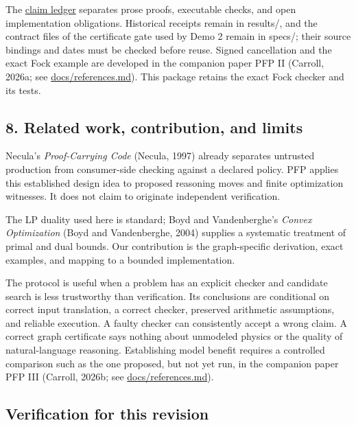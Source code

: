 \documentclass[
  11pt,
]{article}
\begin{document}
The \href{claim_ledger.md}{claim ledger} separates prose proofs,
executable checks, and open implementation obligations. Historical
receipts remain in results/, and the contract files of the certificate
gate used by Demo 2 remain in specs/; their source bindings and dates
must be checked before reuse. Signed cancellation and the exact Fock
example are developed in the companion paper PFP II (Carroll, 2026a; see
\href{../../001_pfp_discrete_cochain_retraction_and_toy_involutions/docs/references.md}{docs/references.md}).
This package retains the exact Fock checker and its tests.

\subsection{8. Related work, contribution, and
limits}\label{related-work-contribution-and-limits}

Necula's \emph{Proof-Carrying Code} (Necula, 1997) already separates
untrusted production from consumer-side checking against a declared
policy. PFP applies this established design idea to proposed reasoning
moves and finite optimization witnesses. It does not claim to originate
independent verification.

The LP duality used here is standard; Boyd and Vandenberghe's
\emph{Convex Optimization} (Boyd and Vandenberghe, 2004) supplies a
systematic treatment of primal and dual bounds. Our contribution is the
graph-specific derivation, exact examples, and mapping to a bounded
implementation.

The protocol is useful when a problem has an explicit checker and
candidate search is less trustworthy than verification. Its conclusions
are conditional on correct input translation, a correct checker,
preserved arithmetic assumptions, and reliable execution. A faulty
checker can consistently accept a wrong claim. A correct graph
certificate says nothing about unmodeled physics or the quality of
natural-language reasoning. Establishing model benefit requires a
controlled comparison such as the one proposed, but not yet run, in the
companion paper PFP III (Carroll, 2026b; see
\href{../../001_pfp_discrete_cochain_retraction_and_toy_involutions/docs/references.md}{docs/references.md}).

\subsection{Verification for this
revision}\label{verification-for-this-revision}
\end{document}
